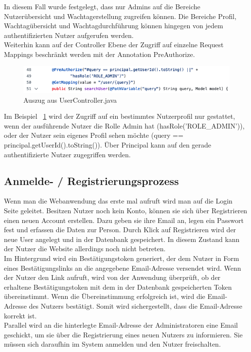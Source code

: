 \documentclass[fontsize=12pt,openright,oneside,paper=a4,BCOR=1cm]{scrbook}
\begin{document}
In diesem Fall wurde festgelegt, dass nur Admins auf die Bereiche \glqq Nutzer\"ubersicht\grqq{} und \glqq Wachtagerstellung\grqq{} zugreifen k\"onnen. Die Bereiche \glqq Profil\grqq{}, \glqq Wachtag\"ubersicht\grqq{} und \glqq Wachtagdurchf\"uhrung\grqq{} k\"onnen hingegen von jedem authentifizierten Nutzer aufgerufen werden. \\
Weiterhin kann auf der Controller Ebene der Zugriff auf einzelne Request Mappings beschr\"ankt werden mit der Annotation \glqq PreAuthorize\grqq{}. 
\begin{figure}[H]
  \centering
    \includegraphics[width=0.7\linewidth]{Anlagen/Code/UserController.png}
    \caption{Auszug aus UserController.java}
  \label{fig:userController}
\end{figure}

Im Beispiel ~\ref{fig:userController} wird der Zugriff auf ein bestimmtes Nutzerprofil nur gestattet, wenn der ausf\"uhrende Nutzer die Rolle Admin hat (\glqq hasRole('ROLE\_ADMIN')\grqq{}), oder der Nutzer sein eigenes Profil sehen m\"ochte (\glqq query == principal.getUserId().toString()\grqq{}). \"Uber Principal kann auf den gerade authentifizierte Nutzer zugegriffen werden.

\subsection{Anmelde- / Registrierungsprozess}

Wenn man die Webanwendung das erste mal aufruft wird man auf die Login Seite geleitet. Besitzen Nutzer noch kein Konto, können sie sich über Registrieren einen neuen Account erstellen. Dazu geben sie ihre Email an, legen ein Passwort fest und erfassen die Daten zur Person. Durch Klick auf \glqq Registrieren\grqq{} wird der neue User angelegt und in der Datenbank gespeichert. In diesem Zustand kann der Nutzer die Website allerdings noch nicht betreten. \\
Im Hintergrund wird ein Bestätigungstoken generiert, der dem Nutzer in Form eines Bestätigungslinks an die angegebene Email-Adresse versendet wird. Wenn der Nutzer den Link aufruft, wird von der Anwendung überprüft, ob der erhaltene Bestätigungstoken mit dem in der Datenbank gespeicherten Token übereinstimmt. Wenn die Übereinstimmung erfolgreich ist, wird die Email-Adresse des Nutzers bestätigt. Somit wird sichergestellt, dass die Email-Adresse korrekt ist. \\
Parallel wird an die hinterlegte Email-Adresse der Administratoren eine Email geschickt, um sie über die Registrierung eines neuen Nutzers zu informieren. Sie müssen sich daraufhin im System anmelden und den Nutzer freischalten.
\end{document}
